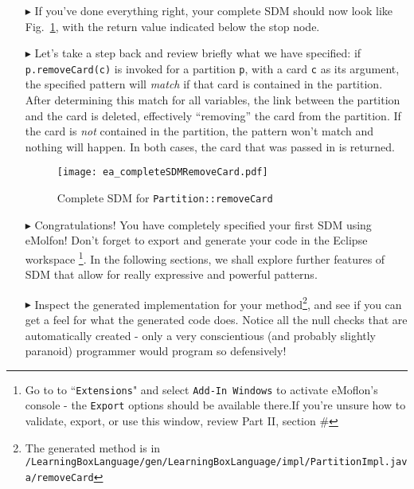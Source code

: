 \begin{itemize}
\item[$\blacktriangleright$] If you've done everything right, your complete SDM should now look like Fig.~\ref{fig:sdm_complete_control_flow}, with the return
value indicated below the stop node.

\item[$\blacktriangleright$] Let's take a step back and review briefly what we have specified:  if \texttt{p.remove\-Card(c)} is invoked for a partition
\texttt{p}, with a card \texttt{c} as its argument, the specified pattern will \emph{match} if that card is contained in the partition. After determining this
match for all variables, the link between the partition and the card is deleted, effectively ``removing'' the card from the partition. If the card is \emph{not}
contained in the partition, the pattern won't match and nothing will happen. In both cases, the card that was passed in is returned.

\vspace{1cm}
\begin{figure}[htbp]
\begin{center}
  \texttt{[image: ea\_completeSDMRemoveCard.pdf]}
  \caption{Complete SDM for \texttt{Partition::removeCard}}  
  \label{fig:sdm_complete_control_flow}
\end{center}
\end{figure}

\item[$\blacktriangleright$] Congratulations! You have completely specified your first SDM using eMolfon! Don't forget to export and generate your code in the
Eclipse workspace \footnote{Go to to ``\texttt{Extensions}" and select \texttt{Add-In Windows} to activate eMoflon's console - the \texttt{Export} options
should be available there.If you're unsure how to validate, export, or use this window, review Part II, section \#}. In the following sections, we shall explore
further features of SDM that allow for really expressive and powerful patterns.

\item[$\blacktriangleright$] Inspect the generated implementation for your method\footnote{The generated method is in
\texttt{/Learning\-Box\-Language/\-gen/\-Learning\-Box\-Language/\-impl/\-Partition\-Impl.java/\-remove\-Card}}, and see if you can get a feel for what the
generated code does. Notice all the null checks that are automatically created - only a very conscientious (and probably slightly paranoid) programmer would
program so defensively!


\end{itemize}
